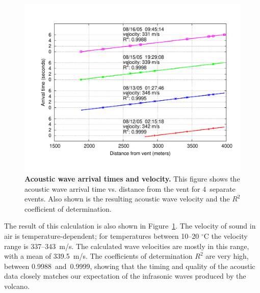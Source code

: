 \begin{figure}[t]
\label{evaluation-fig-acousticArrival}
\begin{center}
\includegraphics[width=\hsize]{./5-evaluation/figs/fidelity/acousticArrival/acoustic.pdf}
\end{center}
\caption{\textbf{Acoustic wave arrival times and velocity.}
This figure shows the acoustic wave arrival time vs. distance from the vent
for 4~separate events. Also shown is the resulting acoustic wave velocity and
the $R^2$ coefficient of determination.}
\end{figure}

The result of this calculation is also shown in
Figure~\ref{evaluation-fig-acousticArrival}.  The velocity of sound in air is
temperature-dependent; for temperatures between 10--20 $^{\circ}$C the
velocity range is 337--343~m/s.  The calculated wave velocities are mostly in
this range, with a mean of 339.5~m/s. The coefficients of determination $R^2$
are very high, between 0.9988~and~0.9999, showing that the timing and quality
of the acoustic data closely matches our expectation of the infrasonic waves
produced by the volcano.

